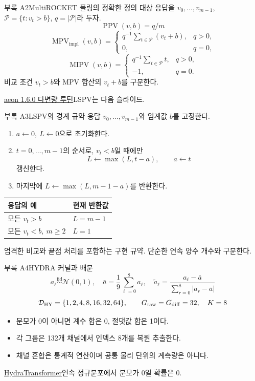 \documentclass[aspectratio=169,11pt]{beamer}
\newcommand{\src}[1]{\par\vfill{\scriptsize\color{gray}#1}\par}
\DeclareMathOperator{\HY}{HY}
\begin{document}
\begin{frame}[t,label=pooling-exact]{부록 A2\quad MultiROCKET 풀링의 정확한 정의}
\small
대상 응답을 \(v_0,\ldots,v_{m-1}\),
\(\mathcal P=\{t:v_t>b\}\), \(q=|\mathcal P|\)라 두자.
\[
 \operatorname{PPV}(v,b)=q/m
\]
\[
 \operatorname{MPV}_{\mathrm{impl}}(v,b)=
 \begin{cases}q^{-1}\sum_{t\in\mathcal P}(v_t+b),&q>0,\\0,&q=0,\end{cases}
\]
\[
 \operatorname{MIPV}(v,b)=
 \begin{cases}q^{-1}\sum_{t\in\mathcal P}t,&q>0,\\-1,&q=0.\end{cases}
\]
비교 조건 \(v_t>b\)와 MPV 합산의 \(v_t+b\)를 구분한다.
\src{\hyperlink{ref-code}{aeon 1.6.0 다변량 루틴}\quad LSPV는 다음 슬라이드.}
\end{frame}

\begin{frame}[t]{부록 A3\quad LSPV의 경계 규약}
\small
응답 \(v_0,\ldots,v_{m-1}\)와 임계값 \(b\)를 고정한다.
\begin{enumerate}
 \item \(a\gets0,\ L\gets0\)으로 초기화한다.
 \item \(t=0,\ldots,m-1\)의 순서로,
  \(v_t<b\)일 때에만
  \[
   L\gets\max(L,t-a),\qquad a\gets t
  \]
  갱신한다.
 \item 마지막에 \(L\gets\max(L,m-1-a)\)를 반환한다.
\end{enumerate}
\begin{tabularx}{\linewidth}{@{}lX@{}}
\toprule 응답의 예 & 현재 반환값\\ \midrule
모든 \(v_t>b\) & \(L=m-1\)\\
모든 \(v_t<b,\ m\geq2\) & \(L=1\)\\ \bottomrule
\end{tabularx}
\src{엄격한 비교와 끝점 처리를 포함하는 구현 규약. 단순한 연속 양수 개수와 구분한다.}
\end{frame}

\begin{frame}[t]{부록 A4\quad HYDRA 커널과 배분}
\small
\[
 a_\ell\overset{\mathrm{iid}}{\sim}\mathcal N(0,1),\quad
 \bar a=\frac19\sum_{\ell=0}^{8}a_\ell,\quad
 \widetilde a_\ell=
 \frac{a_\ell-\bar a}{\sum_{r=0}^{8}|a_r-\bar a|}
\]
\[
 \mathcal D_{\HY}=\{1,2,4,8,16,32,64\},\qquad
 G_{\rm raw}=G_{\rm diff}=32,\quad K=8
\]
\begin{itemize}
 \item 분모가 0이 아니면 계수 합은 0, 절댓값 합은 1이다.
 \item 각 그룹은 132개 채널에서 인덱스 8개를 복원 추출한다.
 \item 채널 혼합은 통계적 연산이며 공통 물리 단위의 계측량은 아니다.
\end{itemize}
\src{\hyperlink{ref-code}{HydraTransformer}\quad 연속 정규분포에서 분모가 0일 확률은 0.}
\end{frame}
\end{document}
